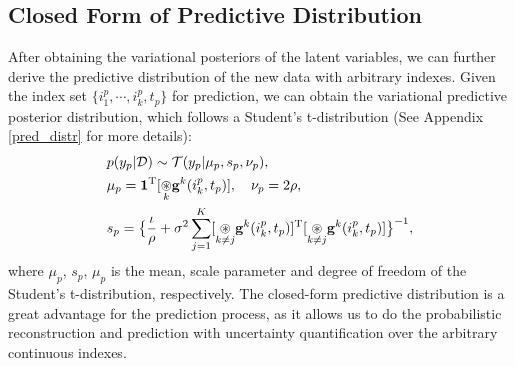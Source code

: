 \subsection{Closed Form of Predictive Distribution}
After obtaining the variational posteriors of the latent variables, we can further derive the predictive distribution of the new data with arbitrary indexes. Given the index set $\{i^p_1,\cdots, i^p_k, t_p\}$ for prediction, we can obtain the variational predictive posterior distribution, which follows a Student's t-distribution (See Appendix \ref{pred_distr} for more details):
\begin{equation}
    \begin{split}
        &p(y_p|\mathcal{D}) \sim \mathcal{T}(y_p|\mu_p, s_p, \nu_p),\\
       &\mu_p =  \boldsymbol{1}^{\mathrm{T}}[\underset{k}{\circledast} 
 \mathbf{g}^k(i_k^p, t_p)], \quad \nu_p = 2\rho,\\
        &s_p =\big\{\frac{\iota}{\rho}+\sigma^2\sum_{j=1}^K[\underset{k\ne j}{\circledast} 
 \mathbf{g}^k(i_k^p, t_p)]^{\mathrm{T}}[\underset{k\ne j}{\circledast} 
 \mathbf{g}^k(i_k^p, t_p)]\big\}^{-1},
    \end{split}
\end{equation}
where $\mu_p$, $s_p$, $\mu_p$ is the mean, scale parameter and degree of freedom of the Student's t-distribution, respectively. The closed-form  predictive distribution is a great advantage for the prediction process, as it allows us to do the probabilistic reconstruction and prediction with uncertainty quantification over the arbitrary continuous indexes.







